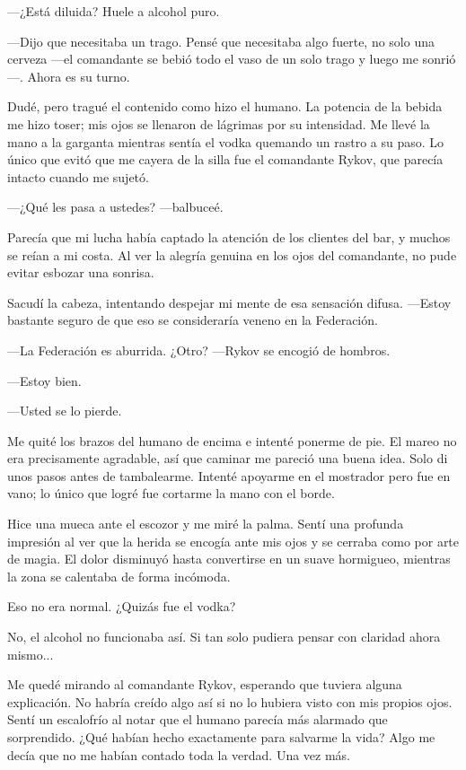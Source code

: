  —¿Está diluida? Huele a alcohol puro.

—Dijo que necesitaba un trago. Pensé que necesitaba algo fuerte, no solo una cerveza —el comandante se bebió todo el vaso de un solo trago y luego me sonrió—. Ahora es su turno.

Dudé, pero tragué el contenido como hizo el humano. La potencia de la bebida me hizo toser; mis ojos se llenaron de lágrimas por su intensidad. Me llevé la mano a la garganta mientras sentía el vodka quemando un rastro a su paso. Lo único que evitó que me cayera de la silla fue el comandante Rykov, que parecía intacto cuando me sujetó.

 —¿Qué les pasa a ustedes? —balbuceé.

Parecía que mi lucha había captado la atención de los clientes del bar, y muchos se reían a mi costa. Al ver la alegría genuina en los ojos del comandante, no pude evitar esbozar una sonrisa.

Sacudí la cabeza, intentando despejar mi mente de esa sensación difusa. —Estoy bastante seguro de que eso se consideraría veneno en la Federación.

—La Federación es aburrida. ¿Otro? —Rykov se encogió de hombros.

—Estoy bien.

—Usted se lo pierde.

Me quité los brazos del humano de encima e intenté ponerme de pie. El mareo no era precisamente agradable, así que caminar me pareció una buena idea. Solo di unos pasos antes de tambalearme. Intenté apoyarme en el mostrador pero fue en vano; lo único que logré fue cortarme la mano con el borde.

Hice una mueca ante el escozor y me miré la palma. Sentí una profunda impresión al ver que la herida se encogía ante mis ojos y se cerraba como por arte de magia. El dolor disminuyó hasta convertirse en un suave hormigueo, mientras la zona se calentaba de forma incómoda.

Eso no era normal. ¿Quizás fue el vodka?

No, el alcohol no funcionaba así. Si tan solo pudiera pensar con claridad ahora mismo...

Me quedé mirando al comandante Rykov, esperando que tuviera alguna explicación. No habría creído algo así si no lo hubiera visto con mis propios ojos. Sentí un escalofrío al notar que el humano parecía más alarmado que sorprendido. ¿Qué habían hecho exactamente para salvarme la vida? Algo me decía que no me habían contado toda la verdad. Una vez más.

